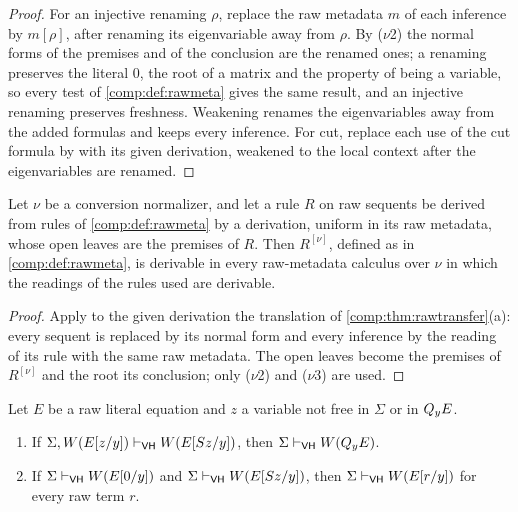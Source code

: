 \begin{proof}
For an injective renaming $\rho$, replace the raw metadata $m$ of each
inference by $m[\rho]$, after renaming its eigenvariable away from $\rho$.
By ($\nu$2) the normal forms of the premises and of the conclusion are the
renamed ones; a renaming preserves the literal $0$, the root of a matrix and
the property of being a variable, so every test of \cref{comp:def:rawmeta}
gives the same result, and an injective renaming preserves freshness.
Weakening renames the eigenvariables away from the added formulas and keeps
every inference. For cut, replace each use of the cut formula by
 with its given derivation, weakened to the local context
after the eigenvariables are renamed.
\end{proof}

\begin{lemma}
\label{comp:lem:rawderived}
Let $\nu$ be a conversion normalizer, and let a rule $R$ on raw sequents be
derived from rules of \cref{comp:def:rawmeta} by a derivation, uniform in
its raw metadata, whose open leaves are the premises of $R$. Then
$R^{[\nu]}$, defined as in \cref{comp:def:rawmeta}, is derivable in every
raw-metadata calculus over $\nu$ in which the readings of the rules used are
derivable.
\end{lemma}

\begin{proof}
Apply to the given derivation the translation of
\cref{comp:thm:rawtransfer}(a): every sequent is replaced by its normal form
and every inference by the reading of its rule with the same raw metadata.
The open leaves become the premises of $R^{[\nu]}$ and the root its
conclusion; only ($\nu$2) and ($\nu$3) are used.
\end{proof}

\begin{lemma}
\label{comp:lem:whcases}
Let $E$ be a raw literal equation and $z$ a variable not free in $\Sigma$ or
in $Q_{y}E$.
\begin{enumerate}[label=(\alph*)]
\item If $\Sigma,W(E[z/y])\vdash_{\mathsf{VH}}W(E[S z/y])$, then
 $\Sigma\vdash_{\mathsf{VH}}W(Q_{y}E)$.
\item If $\Sigma\vdash_{\mathsf{VH}}W(E[0/y])$ and
 $\Sigma\vdash_{\mathsf{VH}}W(E[S z/y])$, then
 $\Sigma\vdash_{\mathsf{VH}}W(E[r/y])$ for every raw term $r$.
\end{enumerate}
\end{lemma}

